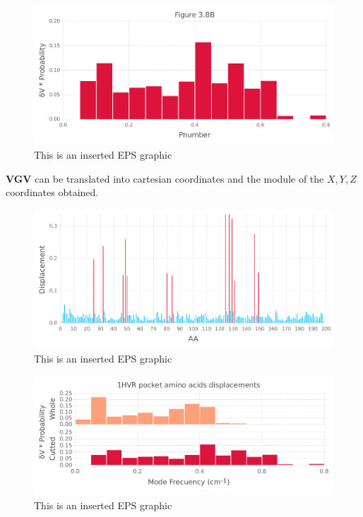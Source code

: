 \documentclass[10pt,letterpaper]{article}
\begin{document}
\begin{figure}[ht]
\begin{center}
\includegraphics[scale=0.5]{1hvr_apo/3bbfigure_hi-precision.pdf}
\caption{This is an inserted EPS graphic}
\label{fig11}
\end{center}
\end{figure}

\FloatBarrier


\textbf{VGV} can be translated into cartesian coordinates and the module of the \(X, Y, Z\) coordinates obtained.

\begin{figure}[ht]
\begin{center}
\includegraphics[scale=0.5]{1hvr_apo/5figure_hi-precision.pdf}
\caption{This is an inserted EPS graphic}
\label{fig13}
\end{center}
\end{figure}

\begin{figure}[ht]
\begin{center}
\includegraphics[scale=0.5]{1hvr_apo/3both_figure_hi-precision.pdf}
\caption{This is an inserted EPS graphic}
\label{fig13}
\end{center}
\end{figure}
\end{document}
